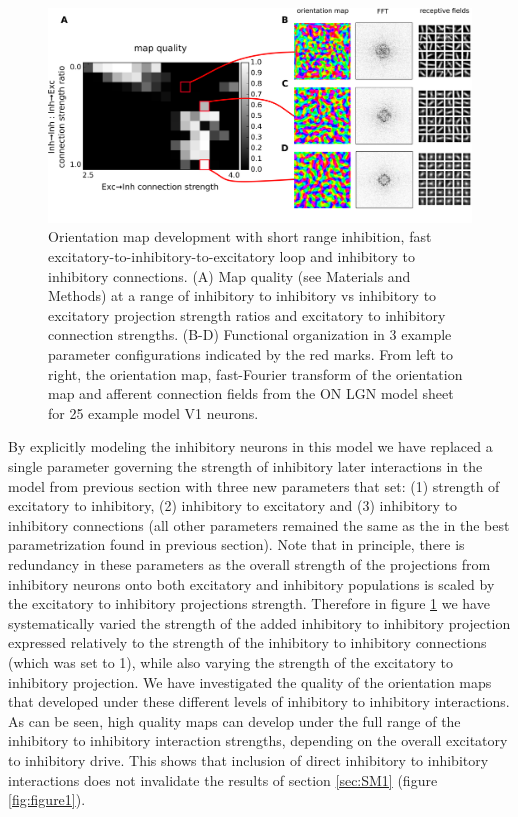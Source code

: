 \documentclass[utf8]{frontiersSCNS}
\begin{document}
\begin{figure}[htpb!] 
\centering
\includegraphics[width=16cm]{./SVG/Figure2/figure2.png}
\caption{Orientation map development with short range inhibition, fast excitatory-to-inhibitory-to-excitatory loop and inhibitory to inhibitory connections. (A) Map quality (see Materials and Methods) at a range of 
inhibitory to inhibitory vs inhibitory to excitatory projection strength ratios and excitatory to inhibitory connection strengths. (B-D) Functional organization in 3 example parameter configurations 
indicated by the red marks. From left to right, the orientation map, fast-Fourier transform of the orientation map and afferent connection fields from the ON LGN model sheet for 25 example model V1 neurons. }
\label{fig:figure2}
\end{figure} 

By explicitly modeling the inhibitory neurons in this model we have replaced a single parameter governing the strength of inhibitory
later interactions in the model from previous section with three new parameters that set: (1) strength of excitatory to inhibitory,
(2) inhibitory to excitatory and (3) inhibitory to inhibitory connections (all other parameters remained the same as the 
in the best parametrization found in previous section). Note that in principle, there is redundancy in these parameters as
the overall strength of the projections from inhibitory neurons onto both excitatory and inhibitory populations is scaled by the 
excitatory to inhibitory projections strength. Therefore in figure \ref{fig:figure2} we have systematically varied the strength of the added inhibitory to inhibitory
projection expressed relatively to the strength of the inhibitory to inhibitory connections (which was set to 1), while also varying the 
strength of the excitatory to inhibitory projection. We have  investigated the quality of the orientation 
maps that developed under these different levels of inhibitory to inhibitory interactions. As can be seen, high quality maps 
can develop under the full range of the inhibitory to inhibitory interaction strengths, depending on the overall 
excitatory to inhibitory drive. This shows that inclusion of direct inhibitory to inhibitory interactions does not 
invalidate the results of section \ref{sec:SM1} (figure \ref{fig:figure1}).
\end{document}
